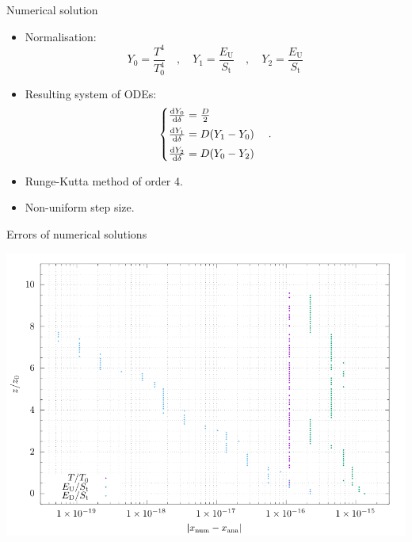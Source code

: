 \documentclass[aspectratio=43]{beamer}
\begin{document}
\begin{frame}{Numerical solution}
  \begin{itemize}
    \item Normalisation:
      \begin{equation}
        \label{eq:normalisation}
        Y_0 = \frac{T^4}{T_0^4}
        \quad , \quad
        Y_1 = \frac{E_\text{U}}{S_\text{t}}
        \quad , \quad
        Y_2 = \frac{E_\text{U}}{S_\text{t}}
      \end{equation}
    \item Resulting system of ODEs:
      \begin{equation}
        \label{eq:numerical_steady_state}
        \left\{
        \begin{array}{@{}l@{}}
          \odv{Y_0}{\delta} = \frac{D}{2} \\[0.5em]
          \odv{Y_1}{\delta} = D (Y_1 - Y_0) \\[0.5em]
          \odv{Y_2}{\delta} = D (Y_0 - Y_2)
        \end{array}
        \right.
        \quad .
      \end{equation}
    \item Runge-Kutta method of order 4.
    \item Non-uniform step size.
  \end{itemize}
\end{frame}

\begin{frame}{Errors of numerical solutions}
  \begin{center}
    \includegraphics[keepaspectratio=true,width=\textheight]{errors}
  \end{center}
\end{frame}
\end{document}
